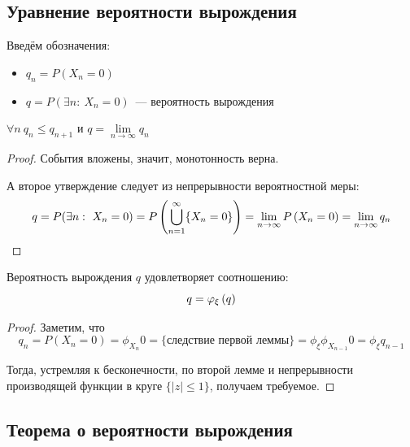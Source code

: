 \subsection{Уравнение вероятности вырождения}

Введём обозначения:
\begin{itemize}
    \item $q_n = P(X_n = 0)$
    \item $q = P(\exists n: \ X_n = 0)$~--- вероятность вырождения
\end{itemize}

\begin{lemma} $\forall n \ q_n \leq q_{n + 1}$ и $q = \lim\limits_{n \to \infty} q_n$
\end{lemma}

\begin{proof} События вложены, значит, монотонность верна.

А второе утверждение следует из непрерывности вероятностной меры:
\begin{equation*}
    q = P(\exists n: \ X_n = 0) = P\left({\bigcup\limits_{n = 1}^\infty \{X_n = 0\}}\right) = \lim\limits_{n \to \infty}P\left({X_n = 0}\right) = \lim\limits_{n \to \infty} q_n
\end{equation*}

\end{proof}

\begin{lemma} Вероятность вырождения $q$ удовлетворяет соотношению:
\begin{equation}
    q = \varphi_{\xi}\left({q}\right)
\end{equation}
\end{lemma}

\begin{proof} Заметим, что
\begin{equation*}
    q_n = P(X_n = 0) = \phi_{X_n}{0} = \{\text{следствие первой леммы}\} = \phi_{\xi}{\phi_{X_{n - 1}}{0}} = \phi_{\xi}{q_{n - 1}}
\end{equation*}

Тогда, устремляя к бесконечности, по второй лемме и непрерывности производящей функции в круге $\{|z| \leq 1\}$, получаем требуемое.

\end{proof}

\subsection{Теорема о вероятности вырождения}

